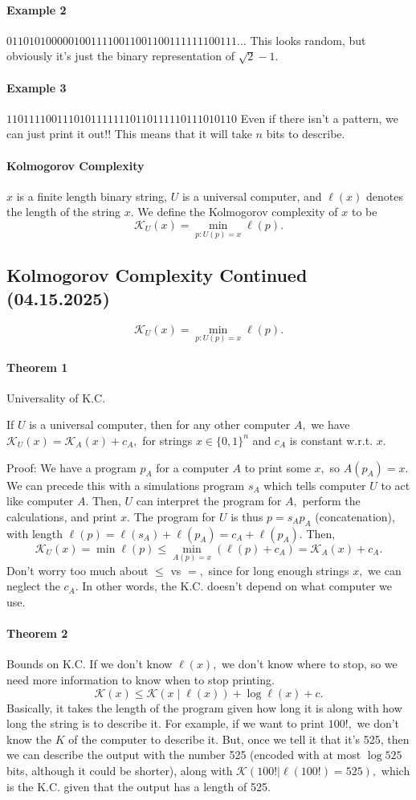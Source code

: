 \documentclass[12pt]{article}
\theoremstyle{remark}
\begin{document}
\paragraph{Example 2}
$01101010000010011110011001100111111100111\dots$
This looks random, but obviously it's just the binary representation of $\sqrt{2}-1.$
\paragraph{Example 3}
$11011110011101011111110110111110111010110$
Even if there isn't a pattern, we can just print it out!! This means that it will take $n$ bits to describe.

\paragraph{Kolmogorov Complexity}
$x$ is a finite length binary string, $U$ is a universal computer, and $\ell(x)$ denotes the length of the string $x.$ We define the Kolmogorov complexity of $x$ to be
\[\mathcal{K}_U(x)=\min_{p:U(p)=x}\ell(p).\]

\subsection{Kolmogorov Complexity Continued (04.15.2025)}
\[\mathcal{K}_U(x)=\min_{p:U(p)=x}\ell(p).\]
\paragraph{Theorem 1} Universality of K.C.

If $U$ is a universal computer, then for any other computer $A,$ we have $\mathcal{K}_U(x)=\mathcal{K}_A(x)+c_A,$
for strings $x\in\{0,1\}^n$ and $c_A$ is constant w.r.t. $x.$

Proof:
We have a program $p_A$ for a computer $A$ to print some $x,$ so $A(p_A)=x.$ We can precede this with a simulations program $s_A$ which tells computer $U$ to act like computer $A.$ Then, $U$ can interpret the program for $A,$ perform the calculations, and print $x.$ The program for $U$ is thus $p=s_Ap_A$ (concatenation), with length $\ell(p)=\ell(s_A)+\ell(p_A)=c_A+\ell(p_A).$ Then,
\[\mathcal{K}_U(x)=\min\ell(p)\le\min_{A(p)=x}(\ell(p)+c_A)=\mathcal{K}_A(x)+c_A.\] Don't worry too much about $\le$ vs $=,$ since for long enough strings $x,$ we can neglect the $c_A.$ In other words, the K.C. doesn't depend on what computer we use.
\paragraph{Theorem 2} Bounds on K.C.
If we don't know $\ell(x),$ we don't know where to stop, so we need more information to know when to stop printing.
\[\mathcal{K}(x)\le\mathcal{K}(x\mid\ell(x))+\log\ell(x)+c.\] Basically, it takes the length of the program given how long it is along with how long the string is to describe it. For example, if we want to print $100!,$ we don't know the $K$ of the computer to describe it. But, once we tell it that it's 525, then we can describe the output with the number 525 (encoded with at most $\log 525$ bits, although it could be shorter), along with $\mathcal{K}(100!|\ell(100!)=525),$ which is the K.C. given that the output has a length of 525.
\end{document}

